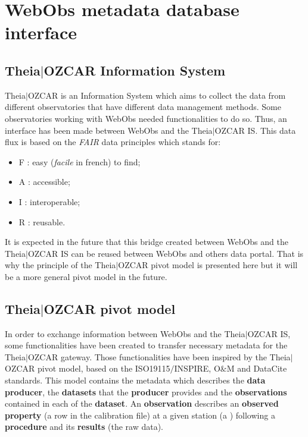 
\chapter{WebObs metadata database interface}



\section{Theia$\vert$OZCAR Information System}

Theia$\vert$OZCAR is an Information System which aims to collect the data from different observatories that have different data management methods. Some observatories working with WebObs needed functionalities to do so. Thus, an interface has been made between WebObs and the Theia$\vert$OZCAR IS. This data flux is based on the \textit{FAIR} data principles which stands for:

\begin{itemize}
\item 	 F : easy (\textit{facile} in french) to find;
\item 	 A : accessible;
\item 	 I : interoperable;
\item 	 R : reusable.
\end{itemize}

It is expected in the future that this bridge created between WebObs and the Theia$\vert$OZCAR IS can be reused between WebObs and others data portal. That is why the principle of the Theia$\vert$OZCAR pivot model is presented here but it will be a more general pivot model in the future.

\section{Theia$\vert$OZCAR pivot model}

In order to exchange information between WebObs and the Theia$\vert$OZCAR IS, some functionalities have been created to transfer necessary metadata for the Theia$\vert$OZCAR gateway. Those functionalities have been inspired by the Theia$\vert$OZCAR pivot model, based on the ISO19115$/$INSPIRE, O$\&$M and DataCite standards. This model contains the metadata which describes the \textbf{data producer}, the \textbf{datasets} that the \textbf{producer} provides and the \textbf{observations} contained in each of the \textbf{dataset}. An \textbf{observation} describes an \textbf{observed property} (a row in the calibration file) at a given {station} (a ) following a \textbf{procedure} and its \textbf{results} (the raw data). 

